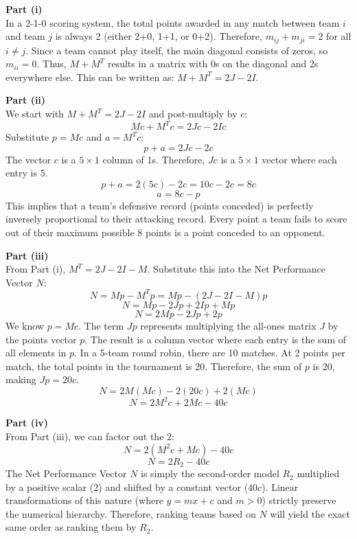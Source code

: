 \begin{solution}
\textbf{Part (i)}\\
In a 2-1-0 scoring system, the total points awarded in any match between team $i$ and team $j$ is always 2 (either 2+0, 1+1, or 0+2). Therefore, $m_{ij} + m_{ji} = 2$ for all $i \neq j$. 
Since a team cannot play itself, the main diagonal consists of zeros, so $m_{ii} = 0$. 
Thus, $M + M^T$ results in a matrix with 0s on the diagonal and 2s everywhere else. 
This can be written as: $M + M^T = 2J - 2I$.

\textbf{Part (ii)}\\
We start with $M + M^T = 2J - 2I$ and post-multiply by $c$:
$$Mc + M^Tc = 2Jc - 2Ic$$
Substitute $p = Mc$ and $a = M^Tc$:
$$p + a = 2Jc - 2c$$
The vector $c$ is a $5 \times 1$ column of 1s. Therefore, $Jc$ is a $5 \times 1$ vector where each entry is 5.
$$p + a = 2(5c) - 2c = 10c - 2c = 8c$$
$$a = 8c - p$$
This implies that a team's defensive record (points conceded) is perfectly inversely proportional to their attacking record. Every point a team fails to score out of their maximum possible 8 points is a point conceded to an opponent.

\textbf{Part (iii)}\\
From Part (i), $M^T = 2J - 2I - M$. 
Substitute this into the Net Performance Vector $N$:
$$N = Mp - M^Tp = Mp - (2J - 2I - M)p$$
$$N = Mp - 2Jp + 2Ip + Mp$$
$$N = 2Mp - 2Jp + 2p$$
We know $p = Mc$. The term $Jp$ represents multiplying the all-ones matrix $J$ by the points vector $p$. The result is a column vector where each entry is the sum of all elements in $p$. 
In a 5-team round robin, there are 10 matches. At 2 points per match, the total points in the tournament is 20. Therefore, the sum of $p$ is 20, making $Jp = 20c$.
$$N = 2M(Mc) - 2(20c) + 2(Mc)$$
$$N = 2M^2c + 2Mc - 40c$$

\textbf{Part (iv)}\\
From Part (iii), we can factor out the 2:
$$N = 2(M^2c + Mc) - 40c$$
$$N = 2R_2 - 40c$$
The Net Performance Vector $N$ is simply the second-order model $R_2$ multiplied by a positive scalar (2) and shifted by a constant vector ($40c$). Linear transformations of this nature (where $y = mx + c$ and $m > 0$) strictly preserve the numerical hierarchy. Therefore, ranking teams based on $N$ will yield the exact same order as ranking them by $R_2$.
\end{solution}

